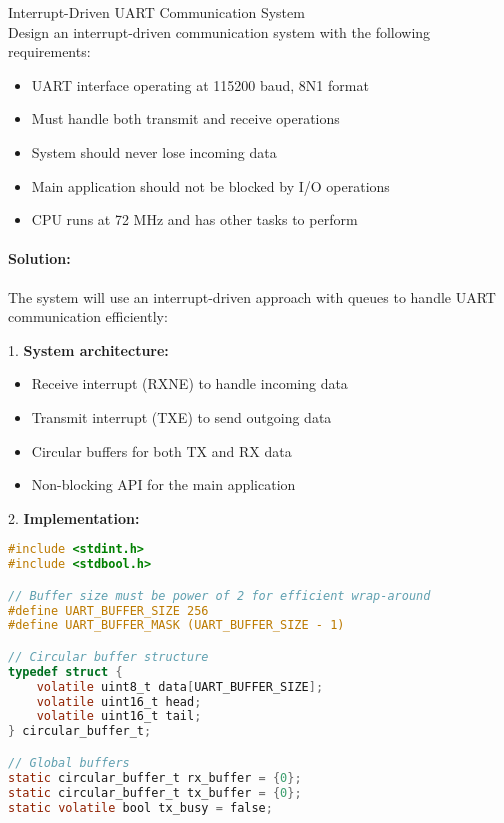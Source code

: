 \begin{example2}{Interrupt-Driven UART Communication System}\\
Design an interrupt-driven communication system with the following requirements:
\begin{itemize}
    \item UART interface operating at 115200 baud, 8N1 format
    \item Must handle both transmit and receive operations
    \item System should never lose incoming data
    \item Main application should not be blocked by I/O operations
    \item CPU runs at 72 MHz and has other tasks to perform
\end{itemize}

\tcblower
\paragraph{Solution:}

The system will use an interrupt-driven approach with queues to handle UART communication efficiently:

1. \textbf{System architecture:}
   \begin{itemize}
     \item Receive interrupt (RXNE) to handle incoming data
     \item Transmit interrupt (TXE) to send outgoing data
     \item Circular buffers for both TX and RX data
     \item Non-blocking API for the main application
   \end{itemize}

2. \textbf{Implementation:}

\begin{lstlisting}[language=C, style=basesmol]
#include <stdint.h>
#include <stdbool.h>

// Buffer size must be power of 2 for efficient wrap-around
#define UART_BUFFER_SIZE 256
#define UART_BUFFER_MASK (UART_BUFFER_SIZE - 1)

// Circular buffer structure
typedef struct {
    volatile uint8_t data[UART_BUFFER_SIZE];
    volatile uint16_t head;
    volatile uint16_t tail;
} circular_buffer_t;

// Global buffers
static circular_buffer_t rx_buffer = {0};
static circular_buffer_t tx_buffer = {0};
static volatile bool tx_busy = false;


\end{lstlisting}
\end{example2}
